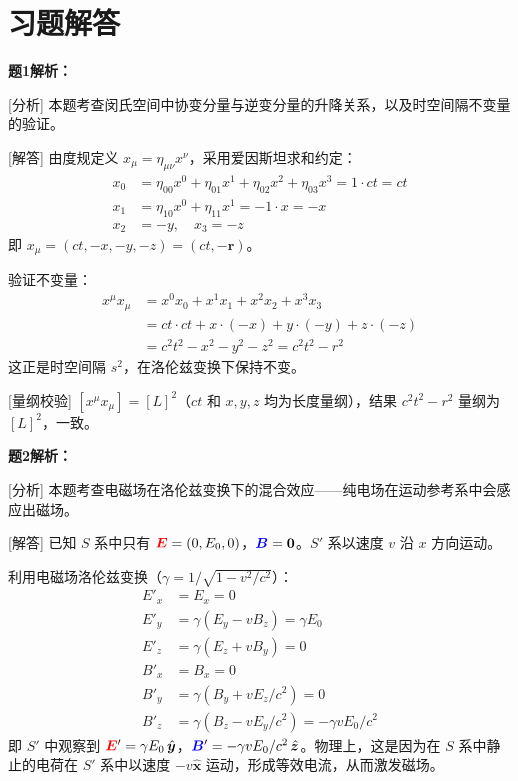 \documentclass[11pt,a4paper,openany,oneside]{book}
\newcommand{\vecE}{\textcolor{red}{\vect{E}}}
\newcommand{\vecB}{\textcolor{blue}{\vect{B}}}
\newcommand{\vect}[1]{\bm{#1}}
\newcommand{\unitvec}[1]{\hat{\vect{#1}}}
\begin{document}
\section*{习题解答}

\textbf{题1解析：}

[分析] 本题考查闵氏空间中协变分量与逆变分量的升降关系，以及时空间隔不变量的验证。

[解答] 由度规定义 $x_\mu = \eta_{\mu\nu} x^\nu$，采用爱因斯坦求和约定：
\begin{align*}
x_0 &= \eta_{00}x^0 + \eta_{01}x^1 + \eta_{02}x^2 + \eta_{03}x^3 = 1 \cdot ct = ct \\
x_1 &= \eta_{10}x^0 + \eta_{11}x^1 = -1 \cdot x = -x \\
x_2 &= -y, \quad x_3 = -z
\end{align*}
即 $x_\mu = (ct, -x, -y, -z) = (ct, -\vect{r})$。

验证不变量：
\begin{align*}
x^\mu x_\mu &= x^0 x_0 + x^1 x_1 + x^2 x_2 + x^3 x_3 \\
&= ct \cdot ct + x \cdot (-x) + y \cdot (-y) + z \cdot (-z) \\
&= c^2t^2 - x^2 - y^2 - z^2 = c^2t^2 - r^2
\end{align*}
这正是时空间隔 $s^2$，在洛伦兹变换下保持不变。

[量纲校验] $[x^\mu x_\mu] = [L]^2$（$ct$ 和 $x,y,z$ 均为长度量纲），结果 $c^2t^2-r^2$ 量纲为 $[L]^2$，一致。\qedsymbol

\textbf{题2解析：}

[分析] 本题考查电磁场在洛伦兹变换下的混合效应——纯电场在运动参考系中会感应出磁场。

[解答] 已知 $S$ 系中只有 $\vecE=(0,E_0,0)$，$\vecB=\vect{0}$。$S'$ 系以速度 $v$ 沿 $x$ 方向运动。

利用电磁场洛伦兹变换（$\gamma = 1/\sqrt{1-v^2/c^2}$）：
\begin{align*}
E'_x &= E_x = 0 \\
E'_y &= \gamma(E_y - vB_z) = \gamma E_0 \\
E'_z &= \gamma(E_z + vB_y) = 0 \\
B'_x &= B_x = 0 \\
B'_y &= \gamma(B_y + vE_z/c^2) = 0 \\
B'_z &= \gamma(B_z - vE_y/c^2) = -\gamma v E_0/c^2
\end{align*}
即 $S'$ 中观察到 $\vecE' = \gamma E_0\,\unitvec{y}$，$\vecB' = -\gamma vE_0/c^2\,\unitvec{z}$。物理上，这是因为在 $S$ 系中静止的电荷在 $S'$ 系中以速度 $-v\unitvec{x}$ 运动，形成等效电流，从而激发磁场。
\end{document}
